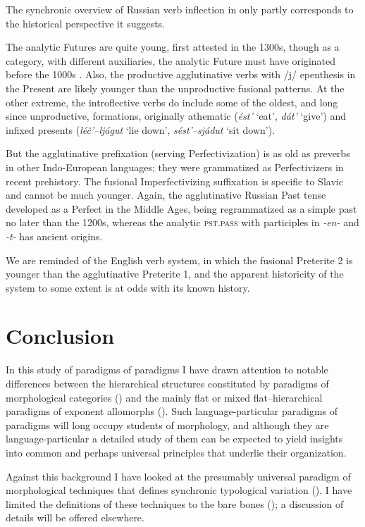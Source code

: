 \documentclass[output=paper, colorlinks,citecolor=brown]{langsci/langscibook}
\begin{document}
The synchronic overview of Russian verb inflection in  only partly corresponds to the historical perspective it suggests. 

The analytic Futures are quite young, first attested in the 1300s, though as a category, with different auxiliaries, the analytic Future must have originated before the 1000s \citep{Andersen2006a}. Also, the productive agglutinative verbs with /j/ epenthesis in the Present are likely younger than the unproductive fusional patterns. At the other extreme, the introflective verbs do include some of the oldest, and long since unproductive, formations, originally athematic (\textit{ést'} `eat', \textit{dát'} `give') and infixed presents (\textit{léč'–ljágut} `lie down', \textit{sést'–sjádut} `sit down'). 

But the agglutinative prefixation (serving Perfectivization) is as old as preverbs in other Indo-European languages; they were grammatized as Perfectivizers in recent prehistory. The fusional Imperfectivizing suffixation is specific to Slavic and cannot be much younger. Again, the agglutinative Russian Past tense developed as a Perfect in the Middle Ages, being regrammatized as a simple past no later than the 1200s, whereas the analytic \textsc{pst.pass} with participles in \textit{-en-} and \textit{-t-} has ancient origins. 

We are reminded of the English verb system, in which the fusional Preterite 2 is younger than the agglutinative Preterite 1, and the apparent historicity of the system to some extent is at odds with its known history. 

\section{Conclusion} \label{andersen_sec3}

In this study of paradigms of paradigms I have drawn attention to notable differences between the hierarchical structures constituted by paradigms of morphological categories () and the mainly flat or mixed flat–hierarchical paradigms of exponent allomorphs (). Such language-particular paradigms of paradigms will long occupy students of morphology, and although they are language-particular a detailed study of them can be expected to yield insights into common and perhaps universal principles that underlie their organization. 

Against this background I have looked at the presumably universal paradigm of  morphological techniques that defines synchronic typological variation (). I have limited the definitions of these techniques to the bare bones (); a discussion of details will be offered elsewhere. 
\end{document}
